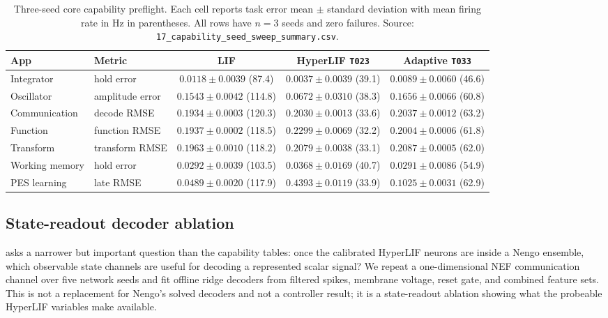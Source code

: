 \documentclass[11pt]{article}
\newcommand{\code}[1]{\texttt{#1}}
\begin{document}
\begin{table}[t]
  \centering
  \caption{Three-seed core capability preflight. Each cell reports task error
  mean \(\pm\) standard deviation with mean firing rate in Hz in parentheses.
  All rows have \(n=3\) seeds and zero failures. Source:
  \code{17\_capability\_seed\_sweep\_summary.csv}.}
  \label{tab:capability-seeded}
  \scriptsize
  \begin{tabular}{llccc}
    \toprule
    App & Metric & LIF & HyperLIF \code{T023} & Adaptive \code{T033} \\
    \midrule
    Integrator & hold error & \(0.0118\pm0.0039\) (87.4) & \(\mathbf{0.0037\pm0.0039}\) (39.1) & \(0.0089\pm0.0060\) (46.6) \\
    Oscillator & amplitude error & \(0.1543\pm0.0042\) (114.8) & \(\mathbf{0.0672\pm0.0310}\) (38.3) & \(0.1656\pm0.0066\) (60.8) \\
    Communication & decode RMSE & \(\mathbf{0.1934\pm0.0003}\) (120.3) & \(0.2030\pm0.0013\) (33.6) & \(0.2037\pm0.0012\) (63.2) \\
    Function & function RMSE & \(\mathbf{0.1937\pm0.0002}\) (118.5) & \(0.2299\pm0.0069\) (32.2) & \(0.2004\pm0.0006\) (61.8) \\
    Transform & transform RMSE & \(\mathbf{0.1963\pm0.0010}\) (118.2) & \(0.2079\pm0.0038\) (33.1) & \(0.2087\pm0.0005\) (62.0) \\
    Working memory & hold error & \(0.0292\pm0.0039\) (103.5) & \(0.0368\pm0.0169\) (40.7) & \(\mathbf{0.0291\pm0.0086}\) (54.9) \\
    PES learning & late RMSE & \(\mathbf{0.0489\pm0.0020}\) (117.9) & \(0.4393\pm0.0119\) (33.9) & \(0.1025\pm0.0031\) (62.9) \\
    \bottomrule
  \end{tabular}
\end{table}

\subsection{State-readout decoder ablation}
\label{sec:capability-decoders}
 asks a narrower but important question than the
capability tables: once the calibrated HyperLIF neurons are inside a Nengo
ensemble, which observable state channels are useful for decoding a represented
scalar signal? We repeat a one-dimensional NEF communication channel over five
network seeds and fit offline ridge decoders from filtered spikes, membrane
voltage, reset gate, and combined feature sets. This is not a replacement for
Nengo's solved decoders and not a controller result; it is a state-readout
ablation showing what the probeable HyperLIF variables make available.
\end{document}
